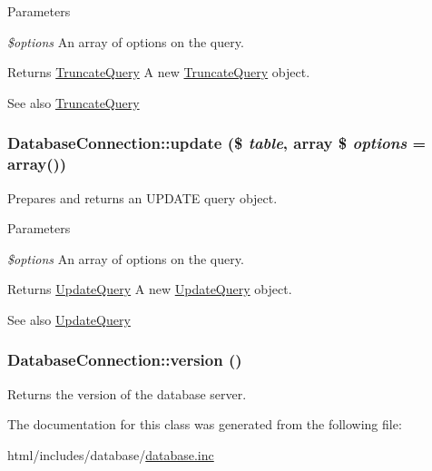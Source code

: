 \begin{DoxyParams}{Parameters}
\item[{\em \$options}]An array of options on the query.\end{DoxyParams}
\begin{DoxyReturn}{Returns}
\hyperlink{classTruncateQuery}{TruncateQuery} A new \hyperlink{classTruncateQuery}{TruncateQuery} object.
\end{DoxyReturn}
\begin{DoxySeeAlso}{See also}
\hyperlink{classTruncateQuery}{TruncateQuery} 
\end{DoxySeeAlso}
\hypertarget{classDatabaseConnection_a4c2fb58226e7045cc9f8a6b2edac630e}{
\subsubsection[{update}]{\setlength{\rightskip}{0pt plus 5cm}DatabaseConnection::update (\$ {\em table}, \/  array \$ {\em options} = {\ttfamily array()})}}
\label{classDatabaseConnection_a4c2fb58226e7045cc9f8a6b2edac630e}
Prepares and returns an UPDATE query object.


\begin{DoxyParams}{Parameters}
\item[{\em \$options}]An array of options on the query.\end{DoxyParams}
\begin{DoxyReturn}{Returns}
\hyperlink{classUpdateQuery}{UpdateQuery} A new \hyperlink{classUpdateQuery}{UpdateQuery} object.
\end{DoxyReturn}
\begin{DoxySeeAlso}{See also}
\hyperlink{classUpdateQuery}{UpdateQuery} 
\end{DoxySeeAlso}
\hypertarget{classDatabaseConnection_a0c3c9a1fa27838cd1ce5d9cc8d8e6a29}{
\subsubsection[{version}]{\setlength{\rightskip}{0pt plus 5cm}DatabaseConnection::version ()}}
\label{classDatabaseConnection_a0c3c9a1fa27838cd1ce5d9cc8d8e6a29}
Returns the version of the database server. 

The documentation for this class was generated from the following file:\begin{DoxyCompactItemize}
\item 
html/includes/database/\hyperlink{database_8inc}{database.inc}\end{DoxyCompactItemize}
